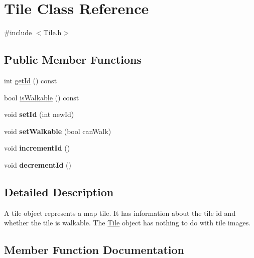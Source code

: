 \hypertarget{class_tile}{}\section{Tile Class Reference}
\label{class_tile}


{\ttfamily \#include $<$Tile.\+h$>$}

\subsection*{Public Member Functions}
\begin{DoxyCompactItemize}
\item 
int \hyperlink{class_tile_ac2fffee91636dcf89e87c25b2e3fd0dd}{get\+Id} () const 
\item 
bool \hyperlink{class_tile_a17eb80eaf2b3222895ff34b61a94bb8f}{is\+Walkable} () const 
\item 
\hypertarget{class_tile_aaea2c49c1fb9e2984561ad2c81030ce1}{}void {\bfseries set\+Id} (int new\+Id)\label{class_tile_aaea2c49c1fb9e2984561ad2c81030ce1}

\item 
\hypertarget{class_tile_a8d63f5d2e5408e2c5f9570c10cb4c835}{}void {\bfseries set\+Walkable} (bool can\+Walk)\label{class_tile_a8d63f5d2e5408e2c5f9570c10cb4c835}

\item 
\hypertarget{class_tile_a723735775252ec1206a5eb53b32873b1}{}void {\bfseries increment\+Id} ()\label{class_tile_a723735775252ec1206a5eb53b32873b1}

\item 
\hypertarget{class_tile_a3d375cc6ae55d3ccf7bad4d746cfbe58}{}void {\bfseries decrement\+Id} ()\label{class_tile_a3d375cc6ae55d3ccf7bad4d746cfbe58}

\end{DoxyCompactItemize}


\subsection{Detailed Description}
A tile object represents a map tile. It has information about the tile id and whether the tile is walkable. The \hyperlink{class_tile}{Tile} object has nothing to do with tile images. 

\subsection{Member Function Documentation}
\hypertarget{class_tile_ac2fffee91636dcf89e87c25b2e3fd0dd}{}
